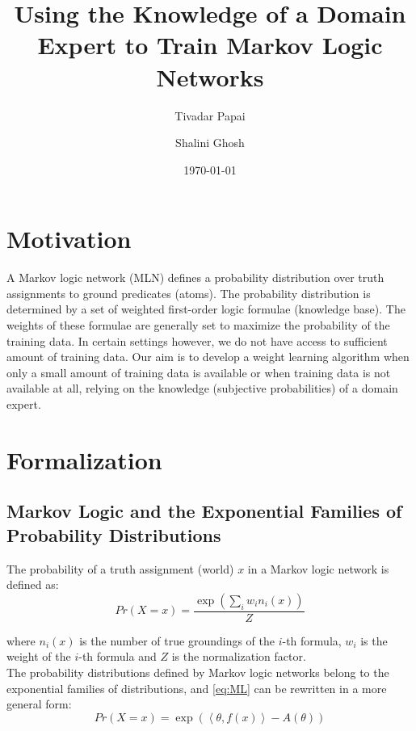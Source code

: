 \documentclass[12pt]{article}
\begin{document}
\title{Using the Knowledge of a Domain Expert to 
Train Markov Logic Networks}
\date{\today}
\author{Tivadar Papai \and Shalini Ghosh}

\maketitle

\section{Motivation}
A Markov logic network (MLN) \cite{2009Domingos} defines a probability 
distribution over truth assignments to ground predicates (atoms). The 
probability distribution is determined by a set of weighted 
first-order logic formulae (knowledge base).
 The weights of these formulae are generally set to maximize
the probability of the training data. In certain settings however,
we do not have access to sufficient amount of training data.
Our aim is to develop a weight learning algorithm when only a small amount 
of training data is available or when training data is not available 
at all, relying on the knowledge (subjective probabilities) of a domain expert.

\section{Formalization}

\subsection{Markov Logic and the Exponential Families 
of Probability Distributions}

The probability of a truth assignment (world) $x$ in a Markov logic network 
is defined as:
\begin{equation}\label{eq:ML}
  Pr(X=x)=\frac{\exp(\sum_{i}w_{i}n_{i}(x))}{Z}
\end{equation}

where $n_{i}(x)$ is the number of true groundings of the $i$-th formula, 
$w_{i}$ is the weight of the $i$-th formula and $Z$ is the normalization
 factor.\\
The probability distributions defined by Markov logic networks belong to 
the exponential families of distributions, and \eqref{eq:ML} can be 
rewritten in a more general form:
\begin{equation}\label{eq:exp}
  Pr(X=x)=\exp \left(\left<\theta,f(x)\right>-A(\theta)\right) 
\end{equation}
\end{document}
